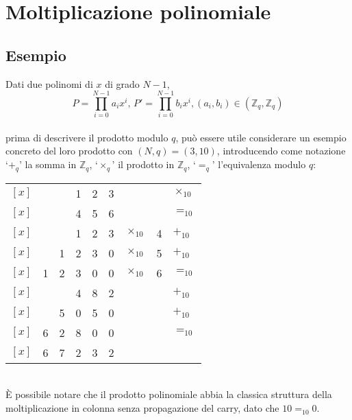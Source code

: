 \pagebreak
\section{Moltiplicazione polinomiale}
\subsection{Esempio}
Dati due polinomi di $x$ di grado $N-1$,
\begin{equation*}
P  = \displaystyle\prod_{i=0}^{N-1} {a}_{i} {x}^{i},\,
        P' = \displaystyle\prod_{i=0}^{N-1} {b}_{i} {x}^{i},
        (a_i,b_i) \in (\mathbb{Z}_q, \mathbb{Z}_q)
\end{equation*}\\
prima di descrivere il prodotto modulo $q$, può essere utile considerare un
esempio concreto del loro prodotto con $(N, q) = (3, 10)$, introducendo come
notazione
`$+_q$' la somma in $\mathbb{Z}_q$,
`$\times_q$' il prodotto in $\mathbb{Z}_q$,
`$=_q$' l'equivalenza modulo $q$:
\\
\begin{table} [h]
    \begin{tabular} {rlllll|ll|l}
        $[x]$ &   &   & 1 & 2 & 3 &  &  & $\times_{10}$             \\ 
        $[x]$ &   &   & 4 & 5 & 6 &  &  & $=_{10}$                  \\ 
        \hline
        $[x]$ &   &   & 1 & 2 & 3 & $\times_{10}$ & 4 & $+_{10}$    \\
        $[x]$ &   & 1 & 2 & 3 & 0 & $\times_{10}$ & 5 & $+_{10}$    \\
        $[x]$ & 1 & 2 & 3 & 0 & 0 & $\times_{10}$ & 6 & $=_{10}$    \\
        \hline
        $[x]$ &   &   & 4 & 8 & 2 &  &  & $+_{10}$                  \\
        $[x]$ &   & 5 & 0 & 5 & 0 &  &  & $+_{10}$                  \\
        $[x]$ & 6 & 2 & 8 & 0 & 0 &  &  & $=_{10}$                  \\
        \hline
        $[x]$ & 6 & 7 & 2 & 3 & 2 &  &  &
    \end{tabular}
\end{table}\\
È possibile notare che il prodotto polinomiale abbia la classica struttura
della moltiplicazione in colonna senza propagazione del carry, dato che
$10=_{10}0$.\\
